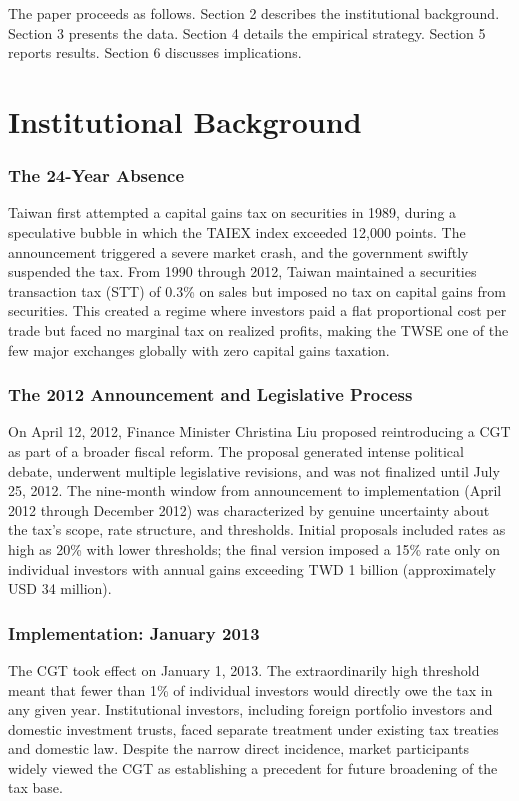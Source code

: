 \documentclass[12pt]{article}
\begin{document}
The paper proceeds as follows. Section 2 describes the institutional background. Section 3 presents the data. Section 4 details the empirical strategy. Section 5 reports results. Section 6 discusses implications.


\section{Institutional Background}

\subsubsection*{The 24-Year Absence} Taiwan first attempted a capital gains tax on securities in 1989, during a speculative bubble in which the TAIEX index exceeded 12,000 points. The announcement triggered a severe market crash, and the government swiftly suspended the tax. From 1990 through 2012, Taiwan maintained a securities transaction tax (STT) of 0.3\% on sales but imposed no tax on capital gains from securities. This created a regime where investors paid a flat proportional cost per trade but faced no marginal tax on realized profits, making the TWSE one of the few major exchanges globally with zero capital gains taxation.

\subsubsection*{The 2012 Announcement and Legislative Process} On April 12, 2012, Finance Minister Christina Liu proposed reintroducing a CGT as part of a broader fiscal reform. The proposal generated intense political debate, underwent multiple legislative revisions, and was not finalized until July 25, 2012. The nine-month window from announcement to implementation (April 2012 through December 2012) was characterized by genuine uncertainty about the tax's scope, rate structure, and thresholds. Initial proposals included rates as high as 20\% with lower thresholds; the final version imposed a 15\% rate only on individual investors with annual gains exceeding TWD 1 billion (approximately USD 34 million).

\subsubsection*{Implementation: January 2013} The CGT took effect on January 1, 2013. The extraordinarily high threshold meant that fewer than 1\% of individual investors would directly owe the tax in any given year. Institutional investors, including foreign portfolio investors and domestic investment trusts, faced separate treatment under existing tax treaties and domestic law. Despite the narrow direct incidence, market participants widely viewed the CGT as establishing a precedent for future broadening of the tax base.
\end{document}
